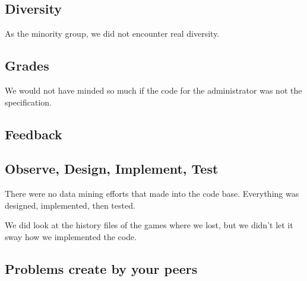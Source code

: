 \documentclass[letterpaper,12pt,oneside]{article}
\begin{document}
\subsection{Diversity}
% 

As the minority group, we did not encounter real diversity.

\subsection{Grades}

We would not have minded so much if the code for the administrator was not
the specification.

\subsection{Feedback}

\subsection{Observe, Design, Implement, Test}
There were no data mining efforts that made into the code base. Everything
was designed, implemented, then tested.

We did look at the history files of the games where we lost, but we didn't
let it sway how we implemented the code.

\subsection{Problems create by your peers}
\end{document}

